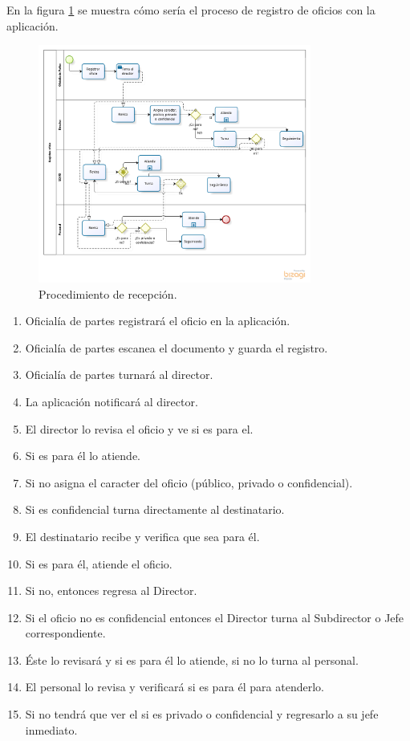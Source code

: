 En la figura \ref{Registro oficio} se muestra cómo sería el proceso de registro de oficios con la aplicación.

\begin{figure}[htbp!]
		\centering
			\includegraphics[width=0.8\textwidth]{images/propuesta/registrooficio}
		\caption{Procedimiento de recepción.}
		\label{Registro oficio}
	\end{figure}

\begin{enumerate}
	\item Oficialía de partes registrará el oficio en la aplicación.
	\item Oficialía de partes escanea el documento y guarda el registro. 
	\item Oficialía de partes turnará al director.
	\item La aplicación notificará al director.
	\item El director lo revisa el oficio y ve si es para el.
	\item Si es para él lo atiende.
	\item Si no asigna el caracter del oficio (público, privado o confidencial).
	\item Si es confidencial turna directamente al destinatario. 
	\item El destinatario recibe y verifica que sea para él.
	\item Si es para él, atiende el oficio.
	\item Si no, entonces regresa al Director.
	\item Si el oficio no es confidencial entonces el Director turna al Subdirector o Jefe correspondiente.
	\item Éste lo revisará y si es para él lo atiende, si no lo turna al personal.
	\item El personal lo revisa y verificará si es para él para atenderlo.
	\item Si no tendrá que ver el si es privado o confidencial y regresarlo a su jefe inmediato.
\end{enumerate}

